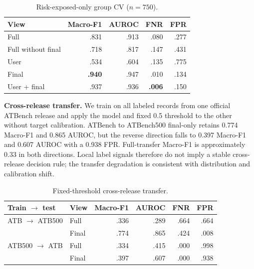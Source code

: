 \documentclass[10pt,twocolumn,twoside]{article}
\newcommand{\mf}{Macro-F1}
\begin{document}
\begin{table}[t]
\centering
\caption{Risk-exposed-only group CV ($n=750$).}
\label{tab:riskexposed}
\scriptsize
\begin{tabular}{lrrrr}
\toprule
View & \mf{} & AUROC & FNR & FPR \\
\midrule
Full & .831 & .913 & .080 & .277 \\
Full without final & .718 & .817 & .147 & .431 \\
User & .534 & .604 & .135 & .775 \\
Final & \textbf{.940} & .947 & .010 & .134 \\
User + final & .937 & .936 & \textbf{.006} & .150 \\
\bottomrule
\end{tabular}
\end{table}

\textbf{Cross-release transfer.}
We train on all labeled records from one official ATBench release and apply the
model and fixed 0.5 threshold to the other without target calibration. ATBench to
ATBench500 final-only retains 0.774 Macro-F1 and 0.865 AUROC, but the reverse
direction falls to 0.397 Macro-F1 and 0.607 AUROC with a 0.938 FPR. Full-transfer
Macro-F1 is approximately 0.33 in both directions. Local label signals therefore
do not imply a stable cross-release decision rule; the transfer degradation is
consistent with distribution and calibration shift.

\begin{table}[t]
\centering
\caption{Fixed-threshold cross-release transfer.}
\label{tab:transfer}
\scriptsize
\setlength{\tabcolsep}{3pt}
\begin{tabular}{llrrrr}
\toprule
Train $\rightarrow$ test & View & \mf{} & AUROC & FNR & FPR \\
\midrule
ATB $\rightarrow$ ATB500 & Full & .336 & .289 & .664 & .664 \\
 & Final & .774 & .865 & .424 & .008 \\
ATB500 $\rightarrow$ ATB & Full & .334 & .415 & .000 & .998 \\
 & Final & .397 & .607 & .000 & .938 \\
\bottomrule
\end{tabular}
\end{table}
\end{document}
